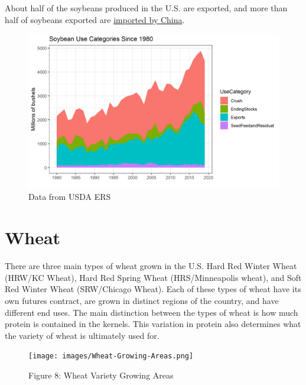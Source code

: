 \documentclass[
  letterpaper,
  DIV=11,
  numbers=noendperiod]{scrreprt}
\begin{document}
About half of the soybeans produced in the U.S. are exported, and more
than half of soybeans exported are
\href{http://farmdocdaily.illinois.edu/2015/03/footprint-of-chinese-demand-for-us-soybeans.html}{imported
by China}.

\begin{figure}[H]

{\centering \includegraphics{assets/PrimerforGrain_SoyUse.png}

}

\caption{Data from USDA ERS}

\end{figure}%

\section{Wheat}\label{wheat}

There are three main types of wheat grown in the U.S. Hard Red Winter
Wheat (HRW/KC Wheat), Hard Red Spring Wheat (HRS/Minneapolis wheat), and
Soft Red Winter Wheat (SRW/Chicago Wheat). Each of these types of wheat
have its own futures contract, are grown in distinct regions of the
country, and have different end uses. The main distinction between the
types of wheat is how much protein is contained in the kernels. This
variation in protein also determines what the variety of wheat is
ultimately used for.

\begin{figure}[H]

{\centering \texttt{[image: images/Wheat-Growing-Areas.png]}

}

\caption{Figure 8: Wheat Variety Growing Areas}

\end{figure}%
\end{document}
